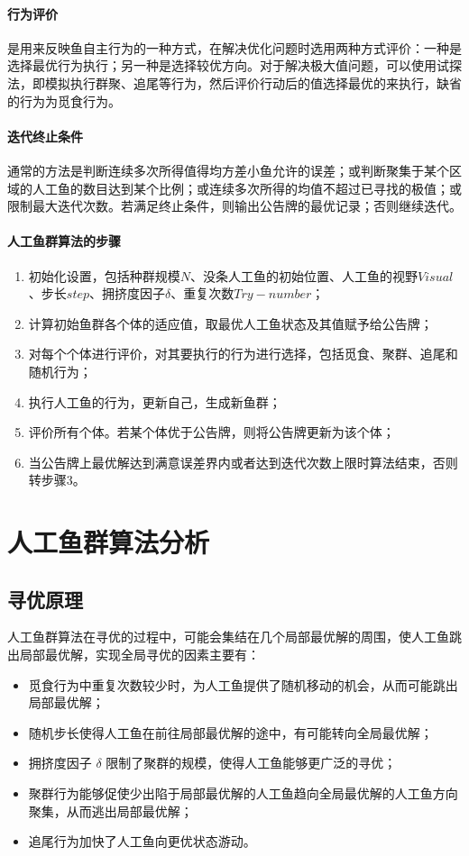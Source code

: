 \documentclass[UTF8]{ctexart}
\begin{document}
		\paragraph{行为评价}是用来反映鱼自主行为的一种方式，在解决优化问题时选用两种方式评价：一种是选择最优行为执行；另一种是选择较优方向。对于解决极大值问题，可以使用试探法，即模拟执行群聚、追尾等行为，然后评价行动后的值选择最优的来执行，缺省的行为为觅食行为。
		\paragraph{迭代终止条件}通常的方法是判断连续多次所得值得均方差小鱼允许的误差；或判断聚集于某个区域的人工鱼的数目达到某个比例；或连续多次所得的均值不超过已寻找的极值；或限制最大迭代次数。若满足终止条件，则输出公告牌的最优记录；否则继续迭代。
		\paragraph{人工鱼群算法的步骤}
			\begin{enumerate}
				\item 初始化设置，包括种群规模$N$、没条人工鱼的初始位置、人工鱼的视野$Visual$、步长$step$、拥挤度因子$\delta$、重复次数$Try-number$；
				\item 计算初始鱼群各个体的适应值，取最优人工鱼状态及其值赋予给公告牌；
				\item 对每个个体进行评价，对其要执行的行为进行选择，包括觅食、聚群、追尾和随机行为；
				\item 执行人工鱼的行为，更新自己，生成新鱼群；
				\item 评价所有个体。若某个体优于公告牌，则将公告牌更新为该个体；
				\item 当公告牌上最优解达到满意误差界内或者达到迭代次数上限时算法结束，否则转步骤3。
			\end{enumerate}

	\section{人工鱼群算法分析}
		\subsection{寻优原理}
			人工鱼群算法在寻优的过程中，可能会集结在几个局部最优解的周围，使人工鱼跳出局部最优解，实现全局寻优的因素主要有：
			\begin{itemize}
				\item 觅食行为中重复次数较少时，为人工鱼提供了随机移动的机会，从而可能跳出局部最优解；
				\item 随机步长使得人工鱼在前往局部最优解的途中，有可能转向全局最优解；
				\item 拥挤度因子 $\delta$ 限制了聚群的规模，使得人工鱼能够更广泛的寻优；
				\item 聚群行为能够促使少出陷于局部最优解的人工鱼趋向全局最优解的人工鱼方向聚集，从而逃出局部最优解；
				\item 追尾行为加快了人工鱼向更优状态游动。
			\end{itemize}
\end{document}
